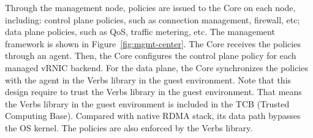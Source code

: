 
Through the management node, policies are issued to the \sys Core on each node, including: control plane policies, such as connection management, firewall, etc; data plane policies, such as QoS, traffic metering, etc. The management framework is shown in Figure~\ref{fig:mgmt-center}. The \sys Core receives the policies through an agent. Then, the \sys Core configures the control plane policy for each managed vRNIC backend.
For the data plane, the \sys Core synchronizes the policies with the agent in the Verbs library in the guest environment.
Note that this design require \sys to trust the Verbs library in the guest environment. That means the Verbs library in the guest environment is included in the TCB (Trusted Computing Base). Compared with native RDMA stack, its data path bypasses the OS kernel. The policies are also enforced by the Verbs library.



